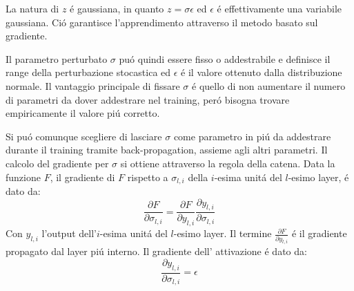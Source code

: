 \documentclass[a4paper,12pt]{report}
\begin{document}
 La natura di $z$ \'e gaussiana, in quanto $z = \sigma \epsilon$ ed $\epsilon$ \'e effettivamente una variabile gaussiana. 
 Ci\'o garantisce l'apprendimento attraverso il metodo basato sul gradiente. 
 
 Il parametro perturbato $\sigma$ pu\' o quindi essere fisso o addestrabile e definisce il range della perturbazione stocastica ed $\epsilon$ \'e il valore ottenuto dalla distribuzione normale. 
 Il vantaggio principale di fissare $\sigma$ \'e quello di non aumentare il numero di parametri da dover addestrare nel training, per\'o bisogna trovare empiricamente il valore pi\'u corretto.
 
 Si pu\'o comunque scegliere di lasciare $\sigma$ come parametro in pi\'u da addestrare durante il training tramite back-propagation, assieme agli altri parametri. 
 Il calcolo del gradiente per $\sigma$ si ottiene attraverso la regola della catena. 
 Data la funzione $F$, il gradiente di $F$ rispetto a $\sigma_{l, i}$ della $i$-esima unit\'a del $l$-esimo layer, \'e dato da:
 \begin{equation} 
  \frac{\partial F}{\partial\sigma_{l, i}} =  \frac{\partial F}{\partial y_{l, i}} \frac{\partial y_{l, i}}{\partial\sigma_{l, i}}
 \end{equation} 
 Con $y_{l, i}$ l'output dell'$i$-esima unit\'a del $l$-esimo layer. 
 Il termine $\frac{\partial F}{\partial y_{l, i}}$ \'e il gradiente propagato dal layer pi\'u interno. 
 Il gradiente dell' attivazione \'e dato da:
 \begin{equation} 
  \frac{\partial y_{l, i}}{\partial\sigma_{l, i}} = \epsilon
 \end{equation} 
\end{document}
